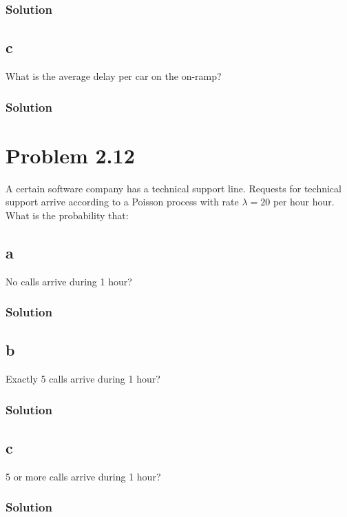 \documentclass{amsart}
\begin{document}
\subsubsection*{Solution}
\subsection*{c}
What is the average delay per car on the on-ramp?
\subsubsection*{Solution}

\section{Problem 2.12} %
A certain software company has a technical support line. Requests for
technical support arrive according to a Poisson process with rate
$\lambda=20\text{ per hour}$ hour. What is the probability that:
\subsection*{a}
No calls arrive during 1 hour?
\subsubsection*{Solution}
\subsection*{b}
Exactly 5 calls arrive during 1 hour?
\subsubsection*{Solution}
\subsection*{c}
5 or more calls arrive during 1 hour?
\subsubsection*{Solution}
\end{document}
